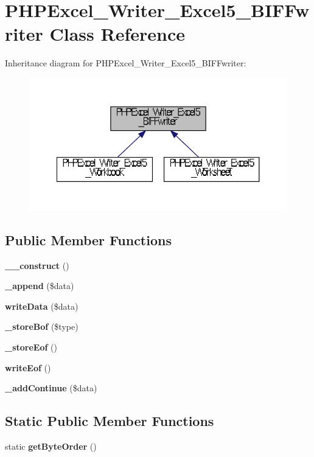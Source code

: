 \section{P\+H\+P\+Excel\+\_\+\+Writer\+\_\+\+Excel5\+\_\+\+B\+I\+F\+Fwriter Class Reference}
\label{class_p_h_p_excel___writer___excel5___b_i_f_fwriter}


Inheritance diagram for P\+H\+P\+Excel\+\_\+\+Writer\+\_\+\+Excel5\+\_\+\+B\+I\+F\+Fwriter\+:\nopagebreak
\begin{figure}[H]
\begin{center}
\leavevmode
\includegraphics[width=350pt]{class_p_h_p_excel___writer___excel5___b_i_f_fwriter__inherit__graph}
\end{center}
\end{figure}
\subsection*{Public Member Functions}
\begin{DoxyCompactItemize}
\item 
{\bf \+\_\+\+\_\+construct} ()
\item 
{\bf \+\_\+append} (\$data)
\item 
{\bf write\+Data} (\$data)
\item 
{\bf \+\_\+store\+Bof} (\$type)
\item 
{\bf \+\_\+store\+Eof} ()
\item 
{\bf write\+Eof} ()
\item 
{\bf \+\_\+add\+Continue} (\$data)
\end{DoxyCompactItemize}
\subsection*{Static Public Member Functions}
\begin{DoxyCompactItemize}
\item 
static {\bf get\+Byte\+Order} ()
\end{DoxyCompactItemize}

